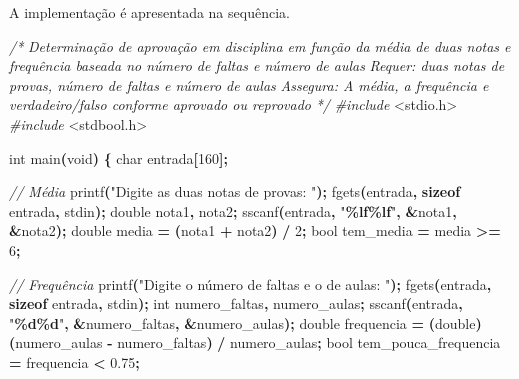 \documentclass[
  11pt,
  a4paper,
]{scrbook}
\newenvironment{Shaded}{\begin{snugshade}}{\end{snugshade}}
\newcommand{\CommentTok}[1]{\textcolor[rgb]{0.56,0.35,0.01}{\textit{#1}}}
\newcommand{\DataTypeTok}[1]{\textcolor[rgb]{0.13,0.29,0.53}{#1}}
\newcommand{\DecValTok}[1]{\textcolor[rgb]{0.00,0.00,0.81}{#1}}
\newcommand{\FloatTok}[1]{\textcolor[rgb]{0.00,0.00,0.81}{#1}}
\newcommand{\ImportTok}[1]{#1}
\newcommand{\KeywordTok}[1]{\textcolor[rgb]{0.13,0.29,0.53}{\textbf{#1}}}
\newcommand{\NormalTok}[1]{#1}
\newcommand{\OperatorTok}[1]{\textcolor[rgb]{0.81,0.36,0.00}{\textbf{#1}}}
\newcommand{\PreprocessorTok}[1]{\textcolor[rgb]{0.56,0.35,0.01}{\textit{#1}}}
\newcommand{\SpecialCharTok}[1]{\textcolor[rgb]{0.81,0.36,0.00}{\textbf{#1}}}
\newcommand{\StringTok}[1]{\textcolor[rgb]{0.31,0.60,0.02}{#1}}
\begin{document}
A implementação é apresentada na sequência.

\begin{Shaded}
\begin{Highlighting}[]
\CommentTok{/*}
\CommentTok{Determinação de aprovação em disciplina em função da média de duas notas e frequência baseada no número de faltas e número de aulas}
\CommentTok{Requer: duas notas de provas, número de faltas e número de aulas}
\CommentTok{Assegura: A média, a frequência e verdadeiro/falso conforme aprovado ou reprovado}
\CommentTok{*/}
\PreprocessorTok{\#include }\ImportTok{\textless{}stdio.h\textgreater{}}
\PreprocessorTok{\#include }\ImportTok{\textless{}stdbool.h\textgreater{}}

\DataTypeTok{int}\NormalTok{ main}\OperatorTok{(}\DataTypeTok{void}\OperatorTok{)} \OperatorTok{\{}
    \DataTypeTok{char}\NormalTok{ entrada}\OperatorTok{[}\DecValTok{160}\OperatorTok{];}

    \CommentTok{// Média}
\NormalTok{    printf}\OperatorTok{(}\StringTok{"Digite as duas notas de provas: "}\OperatorTok{);}
\NormalTok{    fgets}\OperatorTok{(}\NormalTok{entrada}\OperatorTok{,} \KeywordTok{sizeof}\NormalTok{ entrada}\OperatorTok{,}\NormalTok{ stdin}\OperatorTok{);}
    \DataTypeTok{double}\NormalTok{ nota1}\OperatorTok{,}\NormalTok{ nota2}\OperatorTok{;}
\NormalTok{    sscanf}\OperatorTok{(}\NormalTok{entrada}\OperatorTok{,} \StringTok{"}\SpecialCharTok{\%lf\%lf}\StringTok{"}\OperatorTok{,} \OperatorTok{\&}\NormalTok{nota1}\OperatorTok{,} \OperatorTok{\&}\NormalTok{nota2}\OperatorTok{);}
    \DataTypeTok{double}\NormalTok{ media }\OperatorTok{=} \OperatorTok{(}\NormalTok{nota1 }\OperatorTok{+}\NormalTok{ nota2}\OperatorTok{)} \OperatorTok{/} \DecValTok{2}\OperatorTok{;}
    \DataTypeTok{bool}\NormalTok{ tem\_media }\OperatorTok{=}\NormalTok{ media }\OperatorTok{\textgreater{}=} \DecValTok{6}\OperatorTok{;}

    \CommentTok{// Frequência}
\NormalTok{    printf}\OperatorTok{(}\StringTok{"Digite o número de faltas e o de aulas: "}\OperatorTok{);}
\NormalTok{    fgets}\OperatorTok{(}\NormalTok{entrada}\OperatorTok{,} \KeywordTok{sizeof}\NormalTok{ entrada}\OperatorTok{,}\NormalTok{ stdin}\OperatorTok{);}
    \DataTypeTok{int}\NormalTok{ numero\_faltas}\OperatorTok{,}\NormalTok{ numero\_aulas}\OperatorTok{;}
\NormalTok{    sscanf}\OperatorTok{(}\NormalTok{entrada}\OperatorTok{,} \StringTok{"}\SpecialCharTok{\%d\%d}\StringTok{"}\OperatorTok{,} \OperatorTok{\&}\NormalTok{numero\_faltas}\OperatorTok{,} \OperatorTok{\&}\NormalTok{numero\_aulas}\OperatorTok{);}
    \DataTypeTok{double}\NormalTok{ frequencia }\OperatorTok{=} \OperatorTok{(}\DataTypeTok{double}\OperatorTok{)} \OperatorTok{(}\NormalTok{numero\_aulas }\OperatorTok{{-}}\NormalTok{ numero\_faltas}\OperatorTok{)} \OperatorTok{/}\NormalTok{ numero\_aulas}\OperatorTok{;}
    \DataTypeTok{bool}\NormalTok{ tem\_pouca\_frequencia }\OperatorTok{=}\NormalTok{ frequencia }\OperatorTok{\textless{}} \FloatTok{0.75}\OperatorTok{;}


\end{Highlighting}
\end{Shaded}
\end{document}
